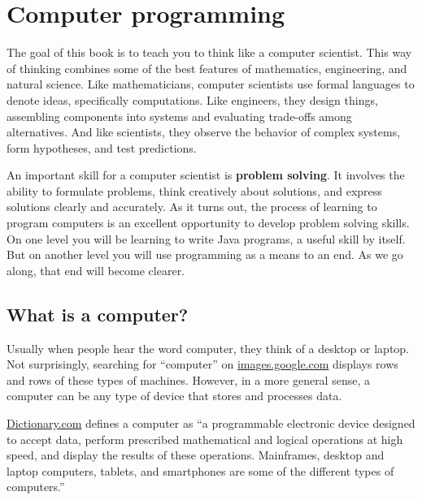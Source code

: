 \chapter{Computer programming}
\label{theway}

The goal of this book is to teach you to think like a computer scientist.
This way of thinking combines some of the best features of mathematics, engineering, and natural science.
Like mathematicians, computer scientists use formal languages to denote ideas, specifically computations.
Like engineers, they design things, assembling components into systems and evaluating trade-offs among alternatives.
And like scientists, they observe the behavior of complex systems, form hypotheses, and test predictions.


An important skill for a computer scientist is {\bf problem solving}.
It involves the ability to formulate problems, think creatively about solutions, and express solutions clearly and accurately.
As it turns out, the process of learning to program computers is an excellent opportunity to develop problem solving skills.
On one level you will be learning to write Java programs, a useful skill by itself.
But on another level you will use programming as a means to an end.
As we go along, that end will become clearer.


\section{What is a computer?}

Usually when people hear the word computer, they think of a desktop or laptop.
Not surprisingly, searching for ``computer'' on \href{https://images.google.com/}{images.google.com} displays rows and rows of these types of machines.
However, in a more general sense, a computer can be any type of device that stores and processes data.

\href{http://www.dictionary.com/browse/computer}{Dictionary.com} defines a computer as ``a programmable electronic device designed to accept data, perform prescribed mathematical and logical operations at high speed, and display the results of these operations. Mainframes, desktop and laptop computers, tablets, and smartphones are some of the different types of computers.''


